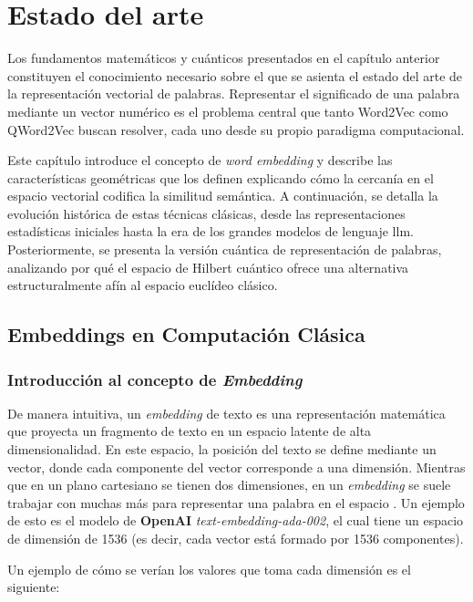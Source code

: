 \chapter{Estado del arte}
\label{chap:estado_arte}

Los fundamentos matemáticos y cuánticos presentados en el capítulo anterior constituyen el conocimiento necesario sobre el que se asienta el estado del arte de la representación vectorial de palabras. Representar el significado de una palabra mediante un vector numérico es el problema central que tanto Word2Vec como QWord2Vec buscan resolver, cada uno desde su propio paradigma computacional.

Este capítulo introduce el concepto de \textit{word embedding} y describe las características geométricas que los definen explicando cómo la cercanía en el espacio vectorial codifica la similitud semántica. A continuación, se detalla la evolución histórica de estas técnicas clásicas, desde las representaciones estadísticas iniciales hasta la era de los grandes modelos de lenguaje \gls{llm}. Posteriormente, se presenta la versión cuántica de representación de palabras, analizando por qué el espacio de Hilbert cuántico ofrece una alternativa estructuralmente afín al espacio euclídeo clásico.

\section{Embeddings en Computación Clásica}
\label{sec:embeddings_clasicos}
\subsection{Introducción al concepto de \textit{Embedding}}
\label{sec:introduccion_embedding}

De manera intuitiva, un \textit{embedding} de texto es una representación matemática que proyecta un fragmento de texto en un espacio latente de alta dimensionalidad. En este espacio, la posición del texto se define mediante un vector, donde cada componente del vector corresponde a una dimensión. Mientras que en un plano cartesiano se tienen dos dimensiones, en un \textit{embedding} se suele trabajar con muchas más para representar una palabra en el espacio \cite{henner_intuitive_embeddings_2023}. Un ejemplo de esto es el modelo de \textbf{OpenAI} \textit{text-embedding-ada-002}, el cual tiene un espacio de dimensión de 1536 (es decir, cada vector está formado por 1536 componentes).

Un ejemplo de cómo se verían los valores que toma cada dimensión es el siguiente:

